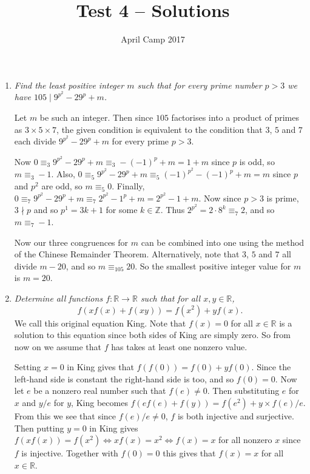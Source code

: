 \documentclass[a4paper,12pt]{article}
\author{April Camp 2017}
\title{Test 4 -- Solutions}
\date{}
\begin{document}
 \maketitle

\begin{enumerate}
	\item %
	\textit{Find the least positive integer $m$ such that for every prime number $p>3$ we have $105 \mid 9^{p^2} -29^p +m$.}
	
	Let $m$ be such an integer. Then since $105$ factorises into a product of primes as $3\times 5\times 7$, the given condition is equivalent to the condition that $3$, $5$ and $7$ each divide $9^{p^2} -29^p +m$ for every prime $p>3$.
	
	Now $0 \equiv_3 9^{p^2} -29^p +m \equiv_3 -(-1)^p+m = 1+m$ since $p$ is odd, so $m\equiv_3 -1$. Also, $0 \equiv_5 9^{p^2} -29^p +m \equiv_5 (-1)^{p^2} -(-1)^p +m = m$ since $p$ and $p^2$ are odd, so $m\equiv_5 0$. Finally, $0\equiv_7 9^{p^2} -29^p +m \equiv_7 2^{p^2} -1^p +m = 2^{p^2}-1+m$. Now since $p>3$ is prime, $3\nmid p$ and so $p^1 = 3k+1$ for some $k\in\mathbb{Z}$. Thus $2^{p^2} = 2\cdot 8^k \equiv_7 2$, and so $m\equiv_7 -1$.
	
	Now our three congruences for $m$ can be combined into one using the method of the Chinese Remainder Theorem. Alternatively, note that $3$, $5$ and $7$ all divide $m-20$, and so $m\equiv_105 20$. So the smallest positive integer value for $m$ is $m=20$.
	
	\item
	\textit{Determine all functions $f: \mathbb{R}\to\mathbb{R}$ such that for all $x,y\in\mathbb{R}$, $$f(xf(x)+f(xy)) = f(x^2) +yf(x).$$}
	We call this original equation King. Note that $f(x)=0$ for all $x\in\mathbb{R}$ is a solution to this equation since both sides of King are simply zero. So from now on we assume that $f$ has takes at least one nonzero value.
	
	Setting $x=0$ in King gives that $f(f(0)) = f(0)+yf(0)$. Since the left-hand side is constant the right-hand side is too, and so $f(0)=0$. Now let $e$ be a nonzero real number such that $f(e)\neq0$. Then substituting $e$ for $x$ and $y/e$ for $y$, King becomes $f(ef(e)+f(y)) = f(e^2)+y\times f(e)/e$. From this we see that since $f(e)/e\neq0$, $f$ is both injective and surjective. Then putting $y=0$ in King gives $f(xf(x)) = f(x^2) \iff xf(x)=x^2 \iff f(x)=x$ for all nonzero $x$ since $f$ is injective. Together with $f(0)=0$ this gives that $f(x)=x$ for all $x\in\mathbb{R}$.
	

\end{enumerate}
\end{document}
